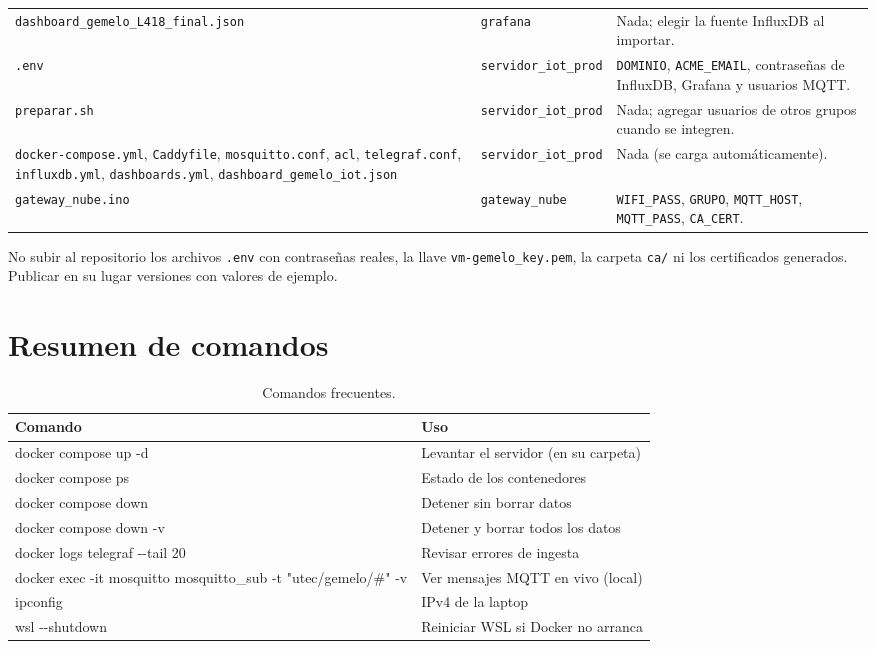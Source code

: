 \documentclass[11pt,a4paper]{article}
\newcommand{\arch}[1]{\texttt{#1}}
\begin{document}
\begin{longtable}{@{}>{\raggedright\arraybackslash}p{}>{\raggedright\arraybackslash}p{}>{\raggedright\arraybackslash}p{}@{}}
\arch{dashboard\_gemelo\_\allowbreak L418\_final.json} & \arch{grafana} & Nada; elegir la fuente InfluxDB al
importar. \\
\arch{.env} & \arch{servidor\_iot\_prod} & \texttt{DOMINIO}, \texttt{ACME\_EMAIL},
contrase\~nas de InfluxDB, Grafana y usuarios MQTT. \\
\arch{preparar.sh} & \arch{servidor\_iot\_prod} & Nada; agregar usuarios de otros grupos
cuando se integren. \\
\arch{docker-compose.yml}, \arch{Caddyfile}, \arch{mosquitto.conf}, \arch{acl},
\arch{telegraf.conf}, \arch{influxdb.yml}, \arch{dashboards.yml},
\arch{dashboard\_gemelo\_iot.json} & \arch{servidor\_iot\_prod} & Nada (se carga autom\'aticamente). \\
\arch{gateway\_nube.ino} & \arch{gateway\_nube} & \texttt{WIFI\_PASS}, \texttt{GRUPO},
\texttt{MQTT\_HOST}, \texttt{MQTT\_PASS}, \texttt{CA\_CERT}. \\
\bottomrule
\end{longtable}

\begin{nota}
No subir al repositorio los archivos \arch{.env} con contrase\~nas reales, la llave
\arch{vm-gemelo\_key.pem}, la carpeta \arch{ca/} ni los certificados generados. Publicar en
su lugar versiones con valores de ejemplo.
\end{nota}

\section{Resumen de comandos}

\begin{table}[H]
\centering
\caption{Comandos frecuentes.}
\begin{tabularx}{\textwidth}{@{}>{\ttfamily\small}p{}X@{}}
\toprule
\normalfont\textbf{Comando} & \textbf{Uso} \\
\midrule
docker compose up -d & Levantar el servidor (en su carpeta) \\
docker compose ps & Estado de los contenedores \\
docker compose down & Detener sin borrar datos \\
docker compose down -v & Detener y borrar todos los datos \\
docker logs telegraf -{}-tail 20 & Revisar errores de ingesta \\
docker exec -it mosquitto mosquitto\_sub -t "utec/gemelo/\#" -v & Ver mensajes MQTT en vivo
(local) \\
ipconfig & IPv4 de la laptop \\
wsl -{}-shutdown & Reiniciar WSL si Docker no arranca \\
\bottomrule
\end{tabularx}
\end{table}
\end{document}
